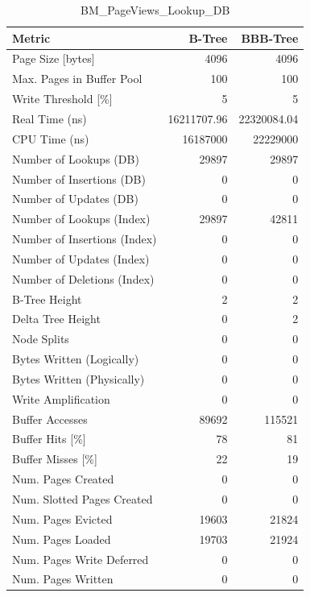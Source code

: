 \begin{table}[ht]
\centering
\caption{BM\_PageViews\_Lookup\_DB}
\label{tab:bm_pageviews_lookup_db}
\begin{tabular}{lrr}
\toprule
Metric & B-Tree & BBB-Tree \\
\midrule
Page Size [bytes] & 4096 & 4096 \\
Max. Pages in Buffer Pool & 100 & 100 \\
Write Threshold [\%] & 5 & 5 \\
\midrule
Real Time (ns) & 16211707.96 & 22320084.04 \\
CPU Time (ns) & 16187000 & 22229000 \\
\midrule
Number of Lookups (DB) & 29897 & 29897 \\
Number of Insertions (DB) & 0 & 0 \\
Number of Updates (DB) & 0 & 0 \\
\midrule
Number of Lookups (Index) & 29897 & 42811 \\
Number of Insertions (Index) & 0 & 0 \\
Number of Updates (Index) & 0 & 0 \\
Number of Deletions (Index) & 0 & 0 \\
\midrule
B-Tree Height & 2 & 2 \\
Delta Tree Height & 0 & 2 \\
Node Splits & 0 & 0 \\
\midrule
Bytes Written (Logically) & 0 & 0 \\
Bytes Written (Physically) & 0 & 0 \\
Write Amplification & 0 & 0 \\
\midrule
Buffer Accesses & 89692 & 115521 \\
Buffer Hits [\%] & 78 & 81 \\
Buffer Misses [\%] & 22 & 19 \\
\midrule
Num. Pages Created & 0 & 0 \\
Num. Slotted Pages Created & 0 & 0 \\
Num. Pages Evicted & 19603 & 21824 \\
Num. Pages Loaded & 19703 & 21924 \\
Num. Pages Write Deferred & 0 & 0 \\
Num. Pages Written & 0 & 0 \\
\bottomrule
\end{tabular}
\end{table}

